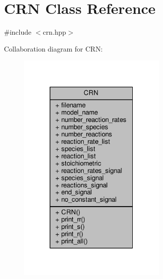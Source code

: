 \hypertarget{classCRN}{}\section{C\+RN Class Reference}
\label{classCRN}


{\ttfamily \#include $<$crn.\+hpp$>$}



Collaboration diagram for C\+RN\+:
\nopagebreak
\begin{figure}[H]
\begin{center}
\leavevmode
\includegraphics[width=205pt]{classCRN__coll__graph}
\end{center}
\end{figure}
